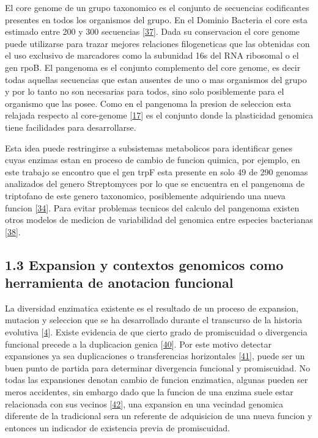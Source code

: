 \documentclass[12pt,twoside]{reedthesis}
\begin{document}
  El core genome de un grupo taxonomico es el conjunto de secuencias
  codificantes presentes en todos los organismos del grupo. En el Dominio
  Bacteria el core esta estimado entre 200 y 300 secuencias
  {[}\protect\hyperlink{ref-halachevux5fcalculatingux5f2011}{37}{]}. Dada
  su conservacion el core genome puede utilizarse para trazar mejores
  relaciones filogeneticas que las obtenidas con el uso exclusivo de
  marcadores como la subunidad 16s del RNA ribosomal o el gen rpoB. El
  pangenoma es el conjunto complemento del core genome, es decir todas
  aquellas secuencias que estan ausentes de uno o mas organismos del grupo
  y por lo tanto no son necesarias para todos, sino solo posiblemente para
  el organismo que las posee. Como en el pangenoma la presion de seleccion
  esta relajada respecto al core-genome
  {[}\protect\hyperlink{ref-firnux5fdarwinianux5f2009}{17}{]} es el
  conjunto donde la plasticidad genomica tiene facilidades para
  desarrollarse.
  
  Esta idea puede restringirse a subsistemas metabolicos para identificar
  genes cuyas enzimas estan en proceso de cambio de funcion quimica, por
  ejemplo, en este trabajo se encontro que el gen trpF esta presente en
  solo 49 de 290 genomas analizados del genero Streptomyces por lo que se
  encuentra en el pangenoma de triptofano de este genero taxonomico,
  posiblemente adquiriendo una nueva funcion
  {[}\protect\hyperlink{ref-maux5funconventionalux5f2013}{34}{]}. Para
  evitar problemas tecnicos del calculo del pangenoma existen otros
  modelos de medicion de variabilidad del genomica entre especies
  bacterianas
  {[}\protect\hyperlink{ref-kislyukux5fgenomicux5f2011}{38}{]}.
  
  \subsection{1.3 Expansion y contextos genomicos como herramienta de
  anotacion
  funcional}\label{expansion-y-contextos-genomicos-como-herramienta-de-anotacion-funcional}
  
  La diversidad enzimatica existente es el resultado de un proceso de
  expansion, mutacion y seleccion que se ha desarrollado durante el
  transcurso de la historia evolutiva
  {[}\protect\hyperlink{ref-khersonskyux5fenzymeux5f2010}{4}{]}. Existe
  evidencia de que cierto grado de promiscuidad o divergencia funcional
  precede a la duplicacion genica
  {[}\protect\hyperlink{ref-hughesux5fevolutionux5f1994}{40}{]}. Por este
  motivo detectar expansiones ya sea duplicaciones o transferencias
  horizontales
  {[}\protect\hyperlink{ref-treangenux5fhorizontalux5f2011}{41}{]}, puede
  ser un buen punto de partida para determinar divergencia funcional y
  promiscuidad. No todas las expansiones denotan cambio de funcion
  enzimatica, algunas pueden ser meros accidentes, sin embargo dado que la
  funcion de una enzima suele estar relacionada con sus vecinos
  {[}\protect\hyperlink{ref-overbeekux5fuseux5f1999}{42}{]}, una expansion
  en una vecindad genomica diferente de la tradicional sera un referente
  de adquisicion de una nueva funcion y entonces un indicador de
  existencia previa de promiscuidad.
  
\end{document}
